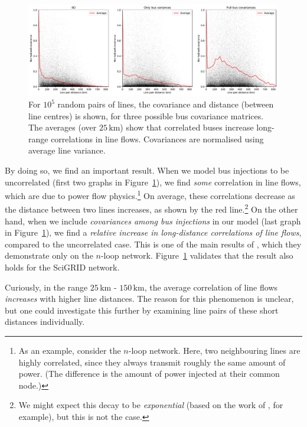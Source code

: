 \documentclass[main.tex]{subfiles}
\begin{document}
\begin{figure}
\centering
\includegraphics[width=\textwidth]{img/covariance_linepairs_with_average.pdf}
\caption{\label{fig:linecovdecay} For $10^5$ random pairs of lines, the covariance and distance (between line centres) is shown, for three possible bus covariance matrices. The averages (over $25 \, \si{\kilo\metre}$) show that correlated buses increase long-range correlations in line flows. Covariances are normalised using average line variance.}
\end{figure}

By doing so, we find an important result. When we model bus injections to be uncorrelated (first two graphs in Figure~\ref{fig:linecovdecay}), we find \emph{some} correlation in line flows, which are due to power flow physics.\footnote{As an example, consider the $n$-loop network. Here, two neighbouring lines are highly correlated, since they always transmit roughly the same amount of power. (The difference is the amount of power injected at their common node.)} On average, these correlations decrease as the distance between two lines increases, as shown by the red line.\footnote{We might expect this decay to be \emph{exponential} (based on the work of \cite{Jung2016}, for example), but this is not the case.} 
On the other hand, when we include \emph{covariances among bus injections} in our model (last graph in Figure~\ref{fig:linecovdecay}), we find a \emph{relative increase in long-distance correlations of line flows}, compared to the uncorrelated case. This is one of the main results of \cite{Nesti2018emergentfailures}, which they demonstrate only on the $n$-loop network. Figure~\ref{fig:linecovdecay} validates that the result also holds for the SciGRID network.

Curiously, in the range $25\,\si{\kilo\meter}$ - $150\,\si{\kilo\meter}$, the average correlation of line flows \emph{increases} with higher line distances. The reason for this phenomenon is unclear, but one could investigate this further by examining line pairs of these short distances individually.
\end{document}
